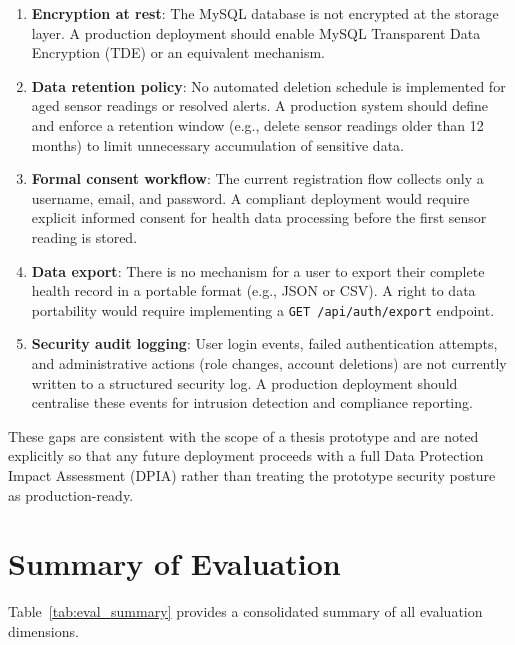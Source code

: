 \begin{enumerate}
    \item \textbf{Encryption at rest}: The MySQL database is not encrypted at the
          storage layer. A production deployment should enable MySQL Transparent
          Data Encryption (TDE) or an equivalent mechanism.

    \item \textbf{Data retention policy}: No automated deletion schedule is implemented
          for aged sensor readings or resolved alerts. A production system should
          define and enforce a retention window (e.g., delete sensor readings older
          than 12 months) to limit unnecessary accumulation of sensitive data.

    \item \textbf{Formal consent workflow}: The current registration flow collects
          only a username, email, and password. A compliant deployment would
          require explicit informed consent for health data processing before the
          first sensor reading is stored.

    \item \textbf{Data export}: There is no mechanism for a user to export their
          complete health record in a portable format (e.g., JSON or CSV). A right
          to data portability would require implementing a \texttt{GET /api/auth/export}
          endpoint.

    \item \textbf{Security audit logging}: User login events, failed authentication
          attempts, and administrative actions (role changes, account deletions)
          are not currently written to a structured security log. A production
          deployment should centralise these events for intrusion detection and
          compliance reporting.
\end{enumerate}

These gaps are consistent with the scope of a thesis prototype and are noted
explicitly so that any future deployment proceeds with a full Data Protection
Impact Assessment (DPIA) rather than treating the prototype security posture as
production-ready.

\section{Summary of Evaluation}

Table~\ref{tab:eval_summary} provides a consolidated summary of all evaluation
dimensions.

